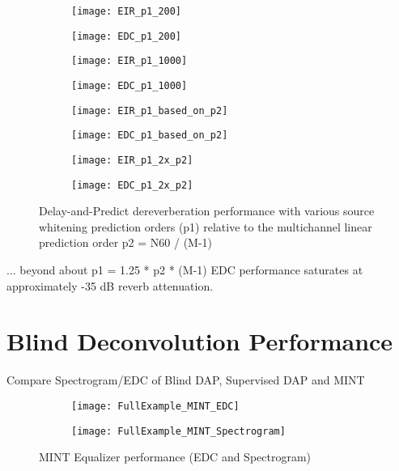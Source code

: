 \begin{figure}[H]
	\centering
	\begin{subfigure}[b]{0.4\textwidth}
		\centering
		\texttt{[image: EIR\_p1\_200]}
	\end{subfigure}
	\begin{subfigure}[b]{0.4\textwidth}
		\centering
		\texttt{[image: EDC\_p1\_200]}
	\end{subfigure}
	\begin{subfigure}[b]{0.4\textwidth}
		\centering
		\texttt{[image: EIR\_p1\_1000]}
	\end{subfigure}
	\begin{subfigure}[b]{0.4\textwidth}
		\centering
		\texttt{[image: EDC\_p1\_1000]}
	\end{subfigure}
	\begin{subfigure}[b]{0.4\textwidth}
		\centering
		\texttt{[image: EIR\_p1\_based\_on\_p2]}
	\end{subfigure}
	\begin{subfigure}[b]{0.4\textwidth}
		\centering
		\texttt{[image: EDC\_p1\_based\_on\_p2]}
	\end{subfigure}
	\begin{subfigure}[b]{0.4\textwidth}
		\centering
		\texttt{[image: EIR\_p1\_2x\_p2]}
	\end{subfigure}
	\begin{subfigure}[b]{0.4\textwidth}
		\centering
		\texttt{[image: EDC\_p1\_2x\_p2]}
	\end{subfigure}
	\caption{Delay-and-Predict dereverberation performance with various source whitening prediction orders (p1) relative to the multichannel linear prediction order p2 = N60 / (M-1)}
	\label{fig:params_p1_compare}
\end{figure}


... beyond about p1 = 1.25 * p2 * (M-1) EDC performance saturates at approximately -35 dB reverb attenuation.



\section{Blind Deconvolution Performance}

Compare Spectrogram/EDC of Blind DAP, Supervised DAP and MINT

\begin{figure}[H]
	\centering
	\begin{subfigure}[b]{0.38\textwidth}
		\centering
		\texttt{[image: FullExample\_MINT\_EDC]}
	\end{subfigure}
	\begin{subfigure}[b]{0.49\textwidth}
		\centering
		\texttt{[image: FullExample\_MINT\_Spectrogram]}
	\end{subfigure}
	\caption{MINT Equalizer performance (EDC and Spectrogram)}
	\label{fig:fullExample_MINT}
\end{figure}


